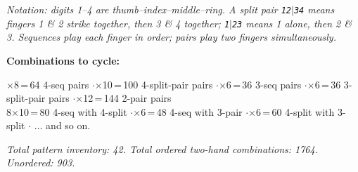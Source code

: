 \documentclass[letterpaper]{article}
\begin{document}
\vspace{2mm}
\fontsize{11}{14}\selectfont
\textit{Notation: digits 1--4 are thumb--index--middle--ring. A split pair \texttt{12\(\vert\)34} means fingers 1 \& 2 strike together, then 3 \& 4 together; \texttt{1\(\vert\)23} means 1 alone, then 2 \& 3. Sequences play each finger in order; pairs play two fingers simultaneously.}

\vspace{3mm}
\fontsize{14}{17}\selectfont
\textbf{Combinations to cycle:}

\fontsize{11}{14}\(\times\)8\,=\,64 4-seq pairs \quad\(\cdot\)\(\times\)10\,=\,100 4-split-pair pairs \quad\(\cdot\)\(\times\)6\,=\,36 3-seq pairs \quad\(\cdot\)\(\times\)6\,=\,36 3-split-pair pairs \quad\(\cdot\)\(\times\)12\,=\,144 2-pair pairs \\
8\(\times\)10\,=\,80 4-seq with 4-split \quad\(\cdot\)\(\times\)6\,=\,48 4-seq with 3-pair \quad\(\cdot\)\(\times\)6\,=\,60 4-split with 3-split \quad\(\cdot\)\quad
... and so on.

\vspace{3mm}
\textit{Total pattern inventory: 42. Total ordered two-hand combinations: 1764. Unordered: 903.}
\end{document}
